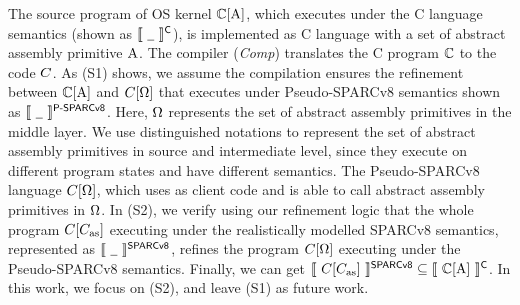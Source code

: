 

The source program of OS kernel
$\mathbb{C}[\text{A}]$, which executes
under the C language semantics (shown as
$\llbracket \ {\underline{\ \,}} \ \rrbracket^{\textsf{C}}$),
is implemented as C language
with a set of abstract assembly primitive $\text{A}$.
The compiler (\textit{Comp}) translates the
C program $\mathbb{C}$ to the \sparc{} code $C$.
As {\color{blue} (S1)} shows,
we assume the compilation ensures the
refinement between $\mathbb{C}[\text{A}]$ and
$C[\Omega]$ that
executes under Pseudo-SPARCv8 semantics shown as
$\llbracket \ {\underline{\ \,}} \ \rrbracket^{\textsf{P-SPARCv8}}$.
Here, $\Omega$ represents the set of
abstract assembly primitives in the middle layer.
We use distinguished notations to represent
the set of abstract assembly primitives in source
and intermediate level, since they execute on
different program states and have different semantics.
The Pseudo-SPARCv8 language $C[\Omega]$,
which uses \sparc{} as client code and is able to
call abstract assembly primitives in $\Omega$.
In {\color{blue} (S2)},
we verify using our refinement logic that
the whole \sparc{} program
$C[C_{\text{as}}]$ executing under the realistically
modelled SPARCv8 semantics, represented as
$\llbracket \ {\underline{\ \,}} \ \rrbracket^{\textsf{SPARCv8}}$, refines
the program $C[\Omega]$ executing
under the Pseudo-SPARCv8 semantics.
Finally, we can get
$\llbracket \ {C[C_{\text{as}}]} \ \rrbracket^{\textsf{SPARCv8}}
\subseteq
\llbracket \ {\mathbb{C}[\text{A}]} \ \rrbracket^{\textsf{C}}$.
In this work, we focus on
{\color{blue} (S2)}, and
leave {\color{blue} (S1)}
as future work.

